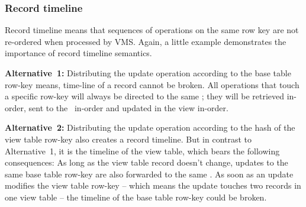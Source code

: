 %

\subsubsection{Record timeline}
\label{subsubsec:record_timeline} 

Record timeline means that sequences of operations on the same row key are not re-ordered 
when processed by VMS.  Again, a little example demonstrates the
importance of record timeline semantics.


\noindent
\textbf{Alternative~1:} Distributing the update operation according to the
base table row-key means, time-line of a record cannot be broken. All 
operations that touch a specific row-key will always be directed to the 
same \VM; they will be retrieved in-order,  sent to the \VM\ in-order and
updated in the view in-order.
%


\noindent
\textbf{Alternative~2:} Distributing the update operation according to the 
hash of the view table row-key also creates a record timeline. But in 
contrast to Alternative~1, it is the timeline of the view table, which
bears the following consequences: As long as the view table record doesn't
change, updates to the same base table row-key are also forwarded to the 
same \VM.  As soon as an update modifies the view table row-key -- which means
the update touches two records in one view table -- the timeline
of the base table row-key could be broken. 

